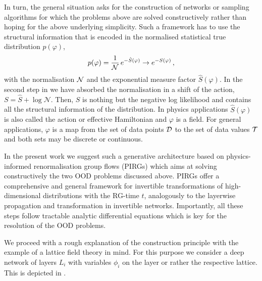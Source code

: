 \documentclass[reprint,amsmath,amssymb,aps,pra,superscriptaddress,nofootinbib,twocolumn,floatfix,nolongbibliography]{revtex4-2}
\begin{document}
In turn, the general situation asks for the construction of networks or sampling algorithms for which the problems above are solved constructively rather than hoping for the above underlying simplicity. Such a framework has to use the structural information that is encoded in the normalised statistical true distribution $p(\varphi)$, 
%
\begin{align} 
	p(\varphi) = \frac{1}{{\cal N}} \,e^{-\hat S(\varphi)}\to  e^{-S(\varphi)}\,,
\label{eq:GenDistr}
\end{align} 
%
with the normalisation ${\cal N}$ and the exponential measure factor $\hat S(\varphi)$. In the second step in  we have absorbed the normalisation in a shift of the action, $S= \hat S +\log \mathcal{N}$. Then, $S$ is nothing but the negative log likelihood and contains all the structural  information of the distribution. In physics applications $\hat S(\varphi)$ is also called the action or effective Hamiltonian and $\varphi$ is a field. For general applications, $\varphi$ is a map from the set of data points ${\cal D}$ to the set of data values ${\cal T}$ and both sets may be discrete or continuous. 

In the present work we suggest such a generative architecture based on physics-informed renormalisation group flows \cite{Ihssen:2024ihp} (PIRGs) which aims at solving constructively the two OOD problems discussed above. PIRGs offer a comprehensive and general framework for invertible transformations of high-dimensional distributions with the RG-time $t$, analogously to the layerwise propagation and transformation in invertible networks. Importantly, all these steps follow tractable analytic differential equations which is key for the resolution of the OOD problems. 

We proceed with a rough explanation of the construction principle with the example of a lattice field theory in mind. For this purpose we consider a deep network of layers $L_i$ with variables $\phi_i$ on the layer or rather the respective lattice. This is depicted in .
\end{document}
